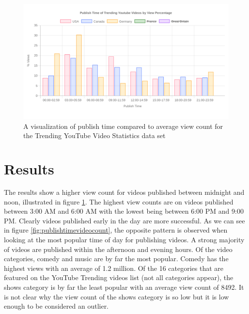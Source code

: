 \documentclass[journal]{vgtc}                %
\begin{document}
\begin{figure}[tb]
	\centering %
	\includegraphics[width=1\columnwidth]{publishtimeviews}
	\caption{A visualization of publish time compared to average view count for the Trending YouTube Video Statistics data set}
	\label{fig:publishtimeviews}
\end{figure}

\section{Results}

The results show a higher view count for videos published between midnight and noon, illustrated in figure \ref{fig:publishtimeviews}. The highest view counts are on videos published between 3:00 AM and 6:00 AM with the lowest being between 6:00 PM and 9:00 PM. Clearly videos published early in the day are more successful. As we can see in figure \ref{fig:publishtimevideocount}, the opposite pattern is observed when looking at the most popular time of day for publishing videos. A strong majority of videos are published within the afternoon and evening hours.
Of the video categories, comedy and music are by far the most popular. Comedy has the highest views with an average of 1.2 million. Of the 16 categories that are featured on the YouTube Trending videos list (not all categories appear), the shows category is by far the least popular with an average view count of 8492. It is not clear why the view count of the shows category is so low but it is low enough to be considered an outlier. 
\end{document}
